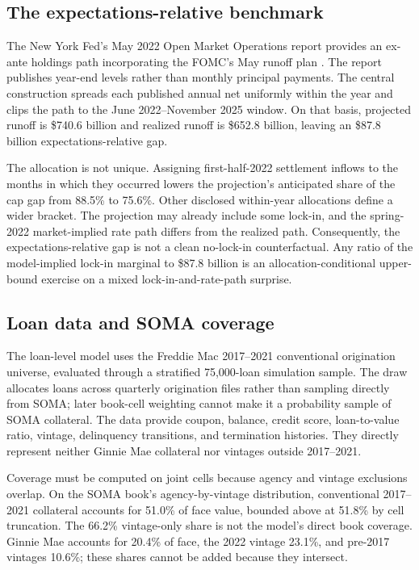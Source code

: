 \subsection{The expectations-relative benchmark}

The New York Fed's May 2022 Open Market Operations report provides an ex-ante holdings path incorporating the FOMC's May runoff plan \citep{nyfed2022}. The report publishes year-end levels rather than monthly principal payments. The central construction spreads each published annual net uniformly within the year and clips the path to the June 2022--November 2025 window. On that basis, projected runoff is \$740.6 billion and realized runoff is \$652.8 billion, leaving an \$87.8 billion expectations-relative gap.

The allocation is not unique. Assigning first-half-2022 settlement inflows to the months in which they occurred lowers the projection's anticipated share of the cap gap from 88.5\% to 75.6\%. Other disclosed within-year allocations define a wider bracket. The projection may already include some lock-in, and the spring-2022 market-implied rate path differs from the realized path. Consequently, the expectations-relative gap is not a clean no-lock-in counterfactual. Any ratio of the model-implied lock-in marginal to \$87.8 billion is an allocation-conditional upper-bound exercise on a mixed lock-in-and-rate-path surprise.

\subsection{Loan data and SOMA coverage}

The loan-level model uses the Freddie Mac 2017--2021 conventional origination universe, evaluated through a stratified 75,000-loan simulation sample. The draw allocates loans across quarterly origination files rather than sampling directly from SOMA; later book-cell weighting cannot make it a probability sample of SOMA collateral. The data provide coupon, balance, credit score, loan-to-value ratio, vintage, delinquency transitions, and termination histories. They directly represent neither Ginnie Mae collateral nor vintages outside 2017--2021.

Coverage must be computed on joint cells because agency and vintage exclusions overlap. On the SOMA book's agency-by-vintage distribution, conventional 2017--2021 collateral accounts for 51.0\% of face value, bounded above at 51.8\% by cell truncation. The 66.2\% vintage-only share is not the model's direct book coverage. Ginnie Mae accounts for 20.4\% of face, the 2022 vintage 23.1\%, and pre-2017 vintages 10.6\%; these shares cannot be added because they intersect.

